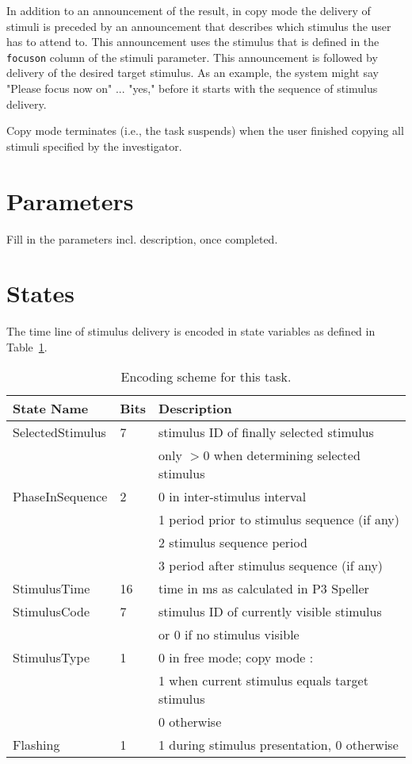 \documentclass[letterpaper,oneside,12pt]{article}
\begin{document}
In addition to an announcement of the result, in copy mode the delivery of 
stimuli is preceded by an announcement that describes which stimulus the user
has to attend to. This announcement uses the stimulus that is defined in the
\texttt{focuson} column of the stimuli parameter. This announcement is followed by
delivery of the desired target stimulus. As an example, the system might say
"Please focus now on" ... "yes," before it starts with the sequence of
stimulus delivery.

Copy mode terminates (i.e., the task suspends) when the user finished copying 
all stimuli specified by the investigator.

\section{Parameters}

Fill in the parameters incl. description, once completed.


\section{States}

The time line of stimulus delivery is encoded in state variables as defined in
Table~\ref{tab:states}.
\begin{table}
\begin{center}
\begin{tabular}[ht]{|l|l|l|}
\hline
\bf{State Name}& \bf{Bits}            & \bf{Description} \\
\hline
\hline
 SelectedStimulus & 7 & stimulus ID of finally selected stimulus \\
                  &   & only $>$0 when determining selected stimulus\\
\hline
 PhaseInSequence  & 2 & 0 in inter-stimulus interval\\
                  &   & 1 period prior to stimulus sequence (if any)\\
                  &   & 2 stimulus sequence period\\
                  &   & 3 period after stimulus sequence (if any)\\
\hline
 StimulusTime     & 16& time in ms as calculated in P3 Speller\\
\hline
 StimulusCode     & 7 & stimulus ID of currently visible stimulus\\
                  &   & or 0 if no stimulus visible\\
\hline
 StimulusType     & 1 & 0 in free mode; copy mode :\\
                  &   & 1 when current stimulus equals target stimulus\\
                  &   & 0 otherwise\\
\hline
 Flashing         & 1 & 1 during stimulus presentation, 0 otherwise\\
\hline
\end{tabular}
\caption{Encoding scheme for this task.}
\label{tab:states}
\end{center}
\end{table}

\end{document}
